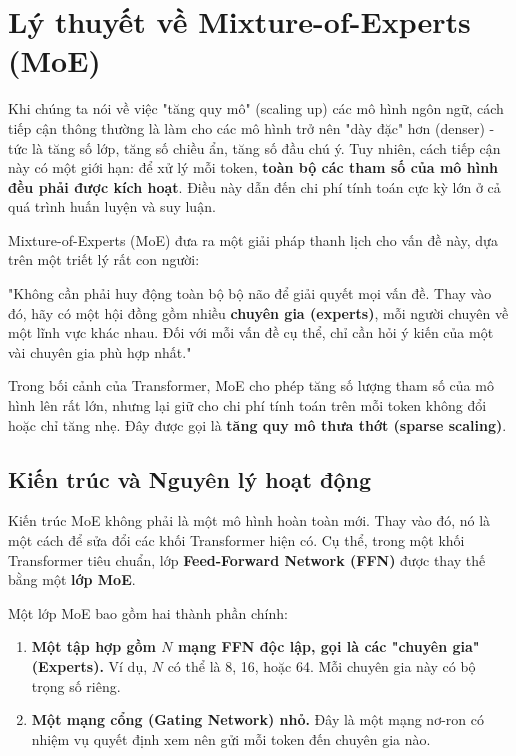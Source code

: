 
\section{Lý thuyết về Mixture-of-Experts (MoE)}
\label{sec:mixture_of_experts}

Khi chúng ta nói về việc "tăng quy mô" (scaling up) các mô hình ngôn ngữ, cách tiếp cận thông thường là làm cho các mô hình trở nên "dày đặc" hơn (denser) - tức là tăng số lớp, tăng số chiều ẩn, tăng số đầu chú ý. Tuy nhiên, cách tiếp cận này có một giới hạn: để xử lý mỗi token, \textbf{toàn bộ các tham số của mô hình đều phải được kích hoạt}. Điều này dẫn đến chi phí tính toán cực kỳ lớn ở cả quá trình huấn luyện và suy luận.

Mixture-of-Experts (MoE) \cite{shazeer2017outrageously, fedus2022switch} đưa ra một giải pháp thanh lịch cho vấn đề này, dựa trên một triết lý rất con người:

\begin{tcolorbox}[
    title=Triết lý của Mixture-of-Experts,
    colback=yellow!10!white, colframe=yellow!50!black, fonttitle=\bfseries
]
"Không cần phải huy động toàn bộ bộ não để giải quyết mọi vấn đề. Thay vào đó, hãy có một hội đồng gồm nhiều \textbf{chuyên gia (experts)}, mỗi người chuyên về một lĩnh vực khác nhau. Đối với mỗi vấn đề cụ thể, chỉ cần hỏi ý kiến của một vài chuyên gia phù hợp nhất."
\end{tcolorbox}

Trong bối cảnh của Transformer, MoE cho phép tăng số lượng tham số của mô hình lên rất lớn, nhưng lại giữ cho chi phí tính toán trên mỗi token không đổi hoặc chỉ tăng nhẹ. Đây được gọi là \textbf{tăng quy mô thưa thớt (sparse scaling)}.

\subsection{Kiến trúc và Nguyên lý hoạt động}
\label{ssec:moe_architecture}

Kiến trúc MoE không phải là một mô hình hoàn toàn mới. Thay vào đó, nó là một cách để sửa đổi các khối Transformer hiện có. Cụ thể, trong một khối Transformer tiêu chuẩn, lớp \textbf{Feed-Forward Network (FFN)} được thay thế bằng một \textbf{lớp MoE}.

Một lớp MoE bao gồm hai thành phần chính:
\begin{enumerate}
    \item \textbf{Một tập hợp gồm $N$ mạng FFN độc lập, gọi là các "chuyên gia" (Experts).} Ví dụ, $N$ có thể là 8, 16, hoặc 64. Mỗi chuyên gia này có bộ trọng số riêng.
    \item \textbf{Một mạng cổng (Gating Network) nhỏ.} Đây là một mạng nơ-ron có nhiệm vụ quyết định xem nên gửi mỗi token đến chuyên gia nào.
\end{enumerate}

